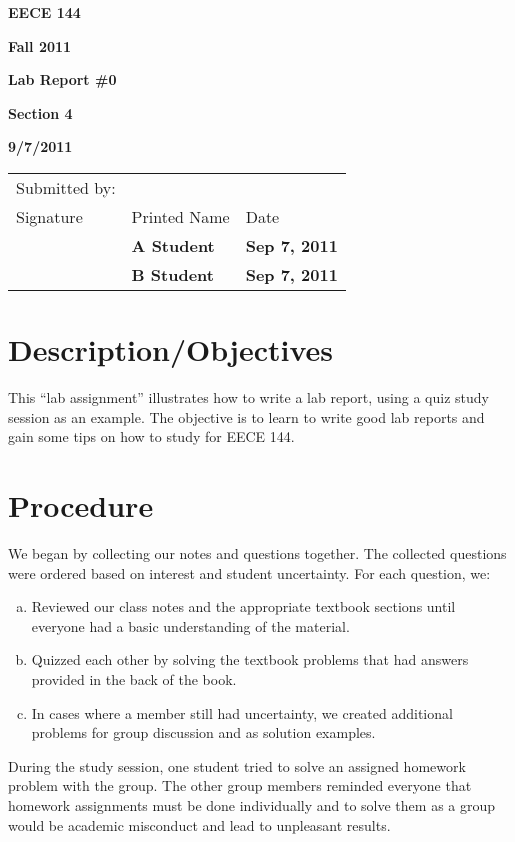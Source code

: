 \documentclass[12pt]{article}
\begin{document}

\centerline{\bf EECE 144}
\centerline{\bf Fall 2011}
\centerline{\bf}
\centerline{\bf Lab Report \#0}
\centerline{\bf Section 4}
\centerline{\bf 9/7/2011}

\begin{center}
\begin{tabularx}{\textwidth}[b]{X X l}
Submitted by: & & \\
Signature & Printed Name & Date \\
\hline
\multicolumn{1}{|X|}{} & \multicolumn{1}{|l|}{\bigstrut \bf A Student} & \multicolumn{1}{|l|}{\bf Sep 7, 2011} \\
\hline
\multicolumn{1}{|X|}{} & \multicolumn{1}{|l|}{\bigstrut \bf B Student} & \multicolumn{1}{|l|}{\bf Sep 7, 2011} \\
\hline
\end{tabularx}
\end{center}

\section{Description/Objectives}

This “lab assignment” illustrates how to write a lab report, using a quiz study
session as an example. The objective is to learn to write good lab reports and
gain some tips on how to study for EECE 144.

\section{Procedure}

We began by collecting our notes and questions together. The collected
questions were ordered based on interest and student uncertainty.
For each question, we:

\begin{enumerate}[a.]
\item Reviewed our class notes and the appropriate textbook sections until
everyone had a basic understanding of the material.
\item Quizzed each other by solving the textbook problems that had answers
provided in the back of the book.
\item In cases where a member still had uncertainty, we created additional
problems for group discussion and as solution examples.
\end{enumerate}

During the study session, one student tried to solve an assigned homework
problem with the group. The other group members reminded everyone that
homework assignments must be done individually and to solve them as a group
would be academic misconduct and lead to unpleasant results.
\end{document}

